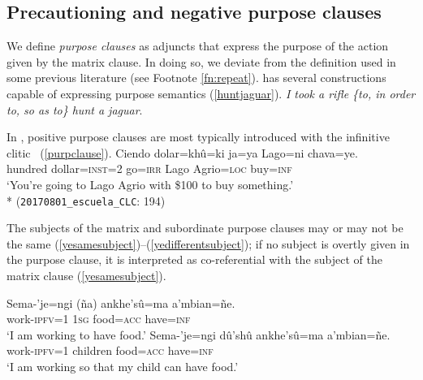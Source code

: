 \documentclass[output=paper,colorlinks,citecolor=brown]{langscibook}
\begin{document}

\subsection{Precautioning and negative purpose clauses} \label{sec:comparison}

We define \textit{purpose clauses} as adjuncts that express the purpose of the action given by the matrix clause. In doing so, we deviate from the definition used in some previous literature (see Footnote \ref{fn:repeat}).  has several constructions capable of expressing purpose semantics (\ref{huntjaguar}).
    \ea \label{huntjaguar}
    \glt \textit{I took a rifle \textup{\{}to, in order to, so as to\textup{\}} hunt a jaguar}.
    \z 
    
In , positive purpose clauses are most typically introduced with the infinitive clitic ~(\ref{purpclause}).
    \ea \label{purpclause} %
    \gll Ciendo  dolar=khû=ki  ja=ya      Lago=ni            {\ob}chava=ye.{\cb} \\
         hundred dollar=\textsc{inst=}2 go=\textsc{irr} {Lago Agrio}=\textsc{loc} buy=\textsc{inf} \\
    \glt `You're going to Lago Agrio with \$100 to buy something.' \\*
    \hfill (\texttt{20170801\_escuela\_CLC}: {\textsc{194}})
    \z 

The subjects of the matrix and subordinate purpose clauses may or may not be the same (\ref{yesamesubject})--(\ref{yedifferentsubject}); if no subject is overtly given in the purpose clause, it is interpreted as co-referential with the subject of the matrix clause (\ref{yesamesubject}). 
\begin{exe}
    \ex \label{yesamesubject}
    \gll Sema-'je=ngi    {{\ob}\rm(}ña{\rm)}   ankhe'sû=ma a'mbian=ñe.{\cb} \\
         work-\textsc{ipfv=1} \textsc{1sg} food=\textsc{acc}   have=\textsc{inf} \\
    \glt `I am working to have food.'
    \ex \label{yedifferentsubject}
    \gll Sema-'je=ngi    {\ob}dû'shû  ankhe'sû=ma a'mbian=ñe.{\cb} \\
         work-\textsc{ipfv=1} children    food=\textsc{acc}   have=\textsc{inf} \\
    \glt `I am working so that my child can have food.'
\end{exe}
\end{document}

